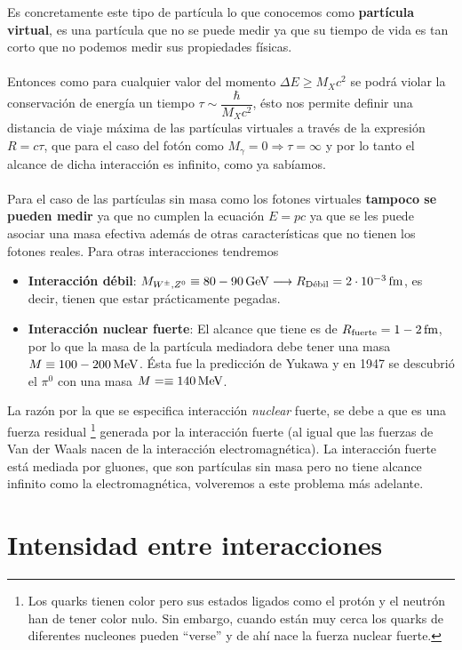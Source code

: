 Es concretamente este tipo de partícula lo que conocemos como \textbf{partícula virtual}, es una partícula que no se puede medir ya que su tiempo de vida es tan corto que no podemos medir sus propiedades físicas.\\\\
Entonces como para cualquier valor del momento $\Delta E\ge M_X c^2$  se podrá violar la conservación de energía un tiempo $\tau\sim \dfrac{\hbar}{M_Xc^2}$, ésto nos permite definir una distancia de viaje máxima de las partículas virtuales a través de la expresión $R=c\tau$, que para el caso del fotón como $M_\gamma=0 \Rightarrow \tau= \infty$  y por lo tanto el alcance de dicha interacción es infinito, como ya sabíamos.\\\\
Para el caso de las partículas sin masa como los fotones virtuales \textbf{tampoco se pueden medir} ya que no cumplen la ecuación $E=pc$ ya que se les puede asociar una masa efectiva además de otras características que no tienen los fotones reales.\clearpage
Para otras interacciones tendremos 
\begin{itemize}
    \item \textbf{Interacción débil}: $M_{W^\pm,Z^0}\equiv \unit[80-90]{GeV} \longrightarrow R_\text{Débil}=\unit[2\cdot 10^{-3}]{fm}$, es decir, tienen que estar prácticamente pegadas.
    \item \textbf{Interacción nuclear fuerte}: El alcance que tiene es de $R_\text{fuerte}=\unit[1-2]{fm}$, por lo que la masa de la partícula mediadora debe tener una masa $M\equiv \unit[100-200]{MeV}$. Ésta fue la predicción de Yukawa y en 1947 se descubrió el $\pi^0$ con una masa $M=\equiv \unit[140]{MeV}$.
\end{itemize}
La razón por la que se especifica interacción \textit{nuclear} fuerte, se debe a que es una fuerza residual \footnote{Los quarks tienen color pero sus estados ligados como el protón y el neutrón han de tener color nulo. Sin embargo, cuando están muy cerca los quarks de diferentes nucleones pueden ``verse'' y de ahí nace la fuerza nuclear fuerte.} generada por la interacción fuerte (al igual que las fuerzas de Van der Waals nacen de la interacción electromagnética). La interacción fuerte está mediada por gluones, que son partículas sin masa pero no tiene alcance infinito como la electromagnética, volveremos a este problema más adelante. \label{sec: particulas virtuales}
\section{Intensidad entre interacciones}
